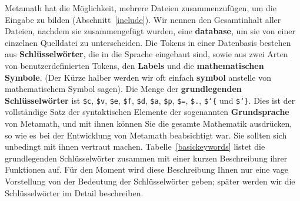 Metamath hat die Möglichkeit, mehrere Dateien zusammenzufügen, um die Eingabe zu bilden (Abschnitt~\ref{include}).  Wir nennen den Gesamtinhalt aller Dateien, nachdem sie zusammengefügt wurden, eine {\bf database}, um sie von einer einzelnen Quelldatei zu unterscheiden.  Die Tokens in einer Datenbasis bestehen aus {\bf Schlüsselwörter}, die in die Sprache eingebaut sind, sowie aus zwei Arten von benutzerdefinierten Tokens, den {\bf Labels} und die {\bf mathematischen Symbole}.  (Der Kürze halber werden wir oft einfach {\bf symbol} anstelle von mathematischem Symbol sagen).  Die Menge der {\bf grundlegenden Schlüsselwörter} ist
\texttt{\$c},
\texttt{\$v},
\texttt{\$e},
\texttt{\$f},
\texttt{\$d},
\texttt{\$a},
\texttt{\$p},
\texttt{\$=},
\texttt{\$.},
\texttt{\$\char`\{} und \texttt{\$\char`\}}.  Dies ist der vollständige Satz der syntaktischen Elemente der sogenannten {\bf Grundsprache} von Metamath, und mit ihnen können Sie die gesamte Mathematik ausdrücken, so wie es bei der Entwicklung von Metamath beabsichtigt war.  Sie sollten sich unbedingt mit ihnen vertraut machen. Tabelle~\ref{basickeywords} listet die grundlegenden Schlüsselwörter zusammen mit einer kurzen Beschreibung ihrer Funktionen auf.  Für den Moment wird diese Beschreibung Ihnen nur eine vage Vorstellung von der Bedeutung der Schlüsselwörter geben; später werden wir die Schlüsselwörter im Detail beschreiben.


